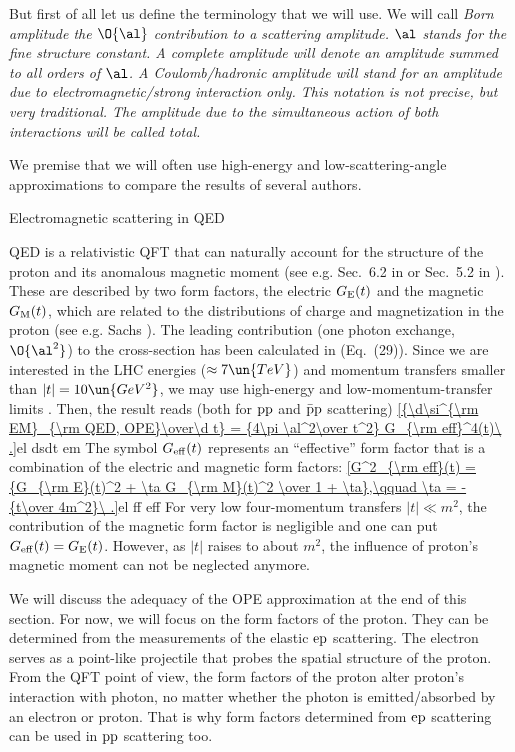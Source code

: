 But first of all let us define the terminology that we will use. We will call \em{Born amplitude} the $\O{\al}$ contribution to a scattering amplitude. $\al$ stands for the fine structure constant. A \em{complete} amplitude will denote an amplitude summed to all orders of $\al$. A \em{Coulomb}/\em{hadronic} amplitude will stand for an amplitude due to electromagnetic/strong interaction only. This notation is not precise, but very traditional. The amplitude due to the simultaneous action of both interactions will be called \em{total}.

We premise that we will often use high-energy and low-scattering-angle approximations to compare the results of several authors.

\caption{Electromagnetic scattering in QED}

QED is a relativistic QFT that can naturally account for the structure of the proton and its anomalous magnetic moment (see e.g. Sec.~6.2 in  or Sec.~5.2 in ). These are described by two form factors, the electric $G_{\rm E}(t)$ and the magnetic $G_{\rm M}(t)$, which are related to the distributions of charge and magnetization in the proton (see e.g. Sachs ). The leading contribution (one photon exchange, $\O{\al^2}$) to the cross-section has been calculated in  (Eq.~(29)). Since we are interested in the LHC energies ($\approx 7\un{TeV}$) and momentum transfers smaller than $|t| = 10\un{GeV^2}$, we may use high-energy and low-momentum-transfer limits . Then, the result reads (both for $\rm pp$ and $\rm \bar p p$ scattering)
\eqref{{\d\si^{\rm EM}_{\rm QED, OPE}\over\d t} = {4\pi \al^2\over t^2} G_{\rm eff}^4(t)\ .}{el dsdt em}
The symbol $G_{\rm eff}(t)$ represents an ``effective'' form factor that is a combination of the electric and magnetic form factors:
\eqref{G^2_{\rm eff}(t) = {G_{\rm E}(t)^2 + \ta G_{\rm M}(t)^2 \over 1 + \ta},\qquad \ta = - {t\over 4m^2}\ .}{el ff eff}
For very low four-momentum transfers $|t| \ll m^2$, the contribution of the magnetic form factor is negligible and one can put $G_{\rm eff}(t) = G_{\rm E}(t)$. However, as $|t|$ raises to about $m^2$, the influence of proton's magnetic moment can not be neglected anymore.

We will discuss the adequacy of the OPE approximation at the end of this section. For now, we will focus on the form factors of the proton. They can be determined from the measurements of the elastic $\rm ep$ scattering. The electron serves as a point-like projectile that probes the spatial structure of the proton. From the QFT point of view, the form factors of the proton alter proton's interaction with photon, no matter whether the photon is emitted/absorbed by an electron or proton. That is why form factors determined from $\rm ep$ scattering can be used in $\rm pp$ scattering too.

